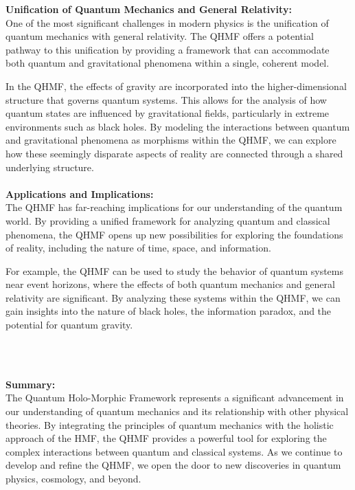 \documentclass{article}
\begin{document}
\textbf{Unification of Quantum Mechanics and General Relativity:}
\\

One of the most significant challenges in modern physics is the unification of quantum mechanics with general relativity. The QHMF offers a potential pathway to this unification by providing a framework that can accommodate both quantum and gravitational phenomena within a single, coherent model.

In the QHMF, the effects of gravity are incorporated into the higher-dimensional structure that governs quantum systems. This allows for the analysis of how quantum states are influenced by gravitational fields, particularly in extreme environments such as black holes. By modeling the interactions between quantum and gravitational phenomena as morphisms within the QHMF, we can explore how these seemingly disparate aspects of reality are connected through a shared underlying structure.
\\
\\

\textbf{Applications and Implications:}
\\

The QHMF has far-reaching implications for our understanding of the quantum world. By providing a unified framework for analyzing quantum and classical phenomena, the QHMF opens up new possibilities for exploring the foundations of reality, including the nature of time, space, and information.

For example, the QHMF can be used to study the behavior of quantum systems near event horizons, where the effects of both quantum mechanics and general relativity are significant. By analyzing these systems within the QHMF, we can gain insights into the nature of black holes, the information paradox, and the potential for quantum gravity.
\\

\

\

\textbf{Summary:}
\\

The Quantum Holo-Morphic Framework represents a significant advancement in our understanding of quantum mechanics and its relationship with other physical theories. By integrating the principles of quantum mechanics with the holistic approach of the HMF, the QHMF provides a powerful tool for exploring the complex interactions between quantum and classical systems. As we continue to develop and refine the QHMF, we open the door to new discoveries in quantum physics, cosmology, and beyond.
\\
\end{document}
